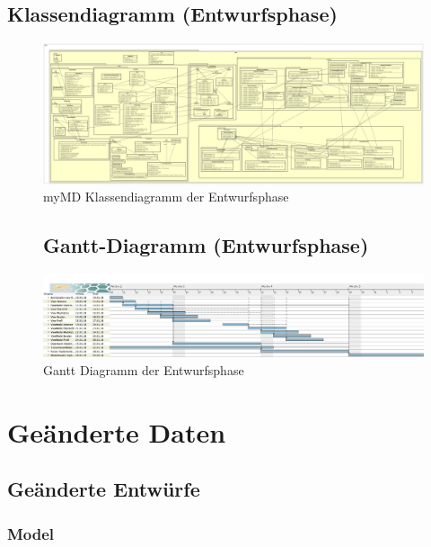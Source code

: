 \documentclass[a4paper]{scrreprt}
\begin{document}
\section{Klassendiagramm (Entwurfsphase)}
\begin{figure}[H]
\hspace{-1.8cm}
\begin{minipage}[c]{\textwidth}
\includegraphics[width=1.6\textwidth, angle=90]{graphics/Klassendiagramme/myMD}
\caption{myMD Klassendiagramm der Entwurfsphase}
\end{minipage}
\end{figure}

\begin{figure}
\section{Gantt-Diagramm (Entwurfsphase)}
\begin{minipage}[c]{\textwidth}
\centering
\includegraphics[width=0.95\textheight, angle=90]{Gantt/GanttChart}
\caption{Gantt Diagramm der Entwurfsphase}
\end{minipage}
\end{figure}

\chapter{Geänderte Daten}
\section{Geänderte Entwürfe}
\subsection{Model}
\end{document}
